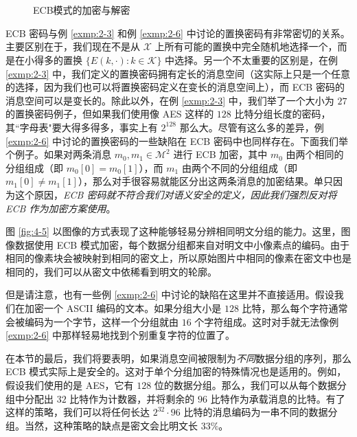 \begin{figure}
  \centering
  \subfigure[加密]{}
  
  \,
  
  \,
  
  \subfigure[解密]{}
  \caption{ECB模式的加密与解密}
  \label{fig:4-4}
\end{figure}

ECB 密码与例 \ref{exmp:2-3} 和例 \ref{exmp:2-6} 中讨论的置换密码有非常密切的关系。主要区别在于，我们现在不是从 $\mathcal{X}$ 上所有可能的置换中完全随机地选择一个，而是在小得多的置换 $\{E(k,\cdot):k\in\mathcal{K}\}$ 中选择。另一个不太重要的区别是，在例 \ref{exmp:2-3} 中，我们定义的置换密码拥有定长的消息空间（这实际上只是一个任意的选择，因为我们也可以将置换密码定义在变长的消息空间上），而 ECB 密码的消息空间可以是变长的。除此以外，在例 \ref{exmp:2-3} 中，我们举了一个大小为 $27$ 的置换密码例子，但如果我们使用像 AES 这样的 $128$ 比特分组长度的密码，其``字母表"要大得多得多，事实上有 $2^{128}$ 那么大。尽管有这么多的差异，例 \ref{exmp:2-6} 中讨论的置换密码的一些缺陷在 ECB 密码中也同样存在。下面我们举个例子。如果对两条消息 $m_0,m_1\in\mathcal{M}^2$ 进行 ECB 加密，其中 $m_0$ 由两个相同的分组组成（即 $m_0[0]=m_0[1]$），而 $m_1$ 由两个不同的分组组成（即 $m_1[0]\neq m_1[1]$），那么对手很容易就能区分出这两条消息的加密结果。单只因为这个原因，\emph{ECB 密码就不符合我们对语义安全的定义，因此我们强烈反对将 ECB 作为加密方案使用}。

图 \ref{fig:4-5} 以图像的方式表现了这种能够轻易分辨相同明文分组的能力。这里，图像数据使用 ECB 模式加密，每个数据分组都来自对明文中小像素点的编码。由于相同的像素块会被映射到相同的密文上，所以原始图片中相同的像素在密文中也是相同的，我们可以从密文中依稀看到明文的轮廓。

但是请注意，也有一些例 \ref{exmp:2-6} 中讨论的缺陷在这里并不直接适用。假设我们在加密一个 ASCII 编码的文本。如果分组大小是 $128$ 比特，那么每个字符通常会被编码为一个字节，这样一个分组就由 $16$ 个字符组成。这时对手就无法像例 \ref{exmp:2-6} 中那样轻易地找到个别重复字符的位置了。

\vspace{8pt}

在本节的最后，我们将要表明，如果消息空间被限制为\emph{不同}数据分组的序列，那么 ECB 模式实际上是安全的。这对于单个分组加密的特殊情况也是适用的。例如，假设我们使用的是 AES，它有 $128$ 位的数据分组。那么，我们可以从每个数据分组中分配出 $32$ 比特作为计数器，并将剩余的 $96$ 比特作为承载消息的比特。有了这样的策略，我们可以将任何长达 $2^{32}\cdot 96$ 比特的消息编码为一串不同的数据分组。当然，这种策略的缺点是密文会比明文长 $33\%$。

